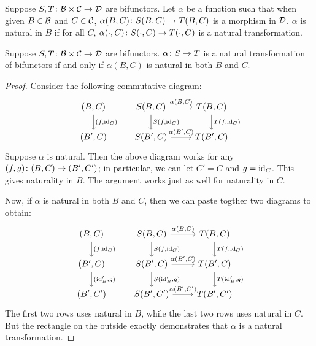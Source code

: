 \begin{definition}
    Suppose \(S,T\colon\mathcal{B}\times\mathcal{C}\to\mathcal{D}\) are bifunctors.
    Let \(\alpha\) be a function such that when given \(B \in \mathcal{B}\) and \(C \in \mathcal{C}\),
    \(\alpha(B,C)\colon S(B,C)\to T(B,C)\) is a morphism in \(\mathcal{D}\).
    \(\alpha\) is natural in \(B\) if for all \(C\),
    \(\alpha(\cdot,C)\colon S(\cdot,C)\to T(\cdot,C)\) is a natural transformation.
\end{definition}
\begin{proposition}\label{prop:natural-bifunctor}
    Suppose \(S,T\colon\mathcal{B}\times\mathcal{C}\to\mathcal{D}\) are bifunctors.
    \(\alpha\colon S\to T\) is a natural transformation of bifunctors
    if and only if \(\alpha(B,C)\) is natural in both \(B\) and \(C\).
\end{proposition}
\begin{proof}
    Consider the following commutative diagram:
    \begin{equation*}
        \begin{tikzcd}
            (B,C) \arrow{d}{(f,\id_C)} & S(B,C) \arrow{d}{S(f,\id_C)} \arrow{r}{\alpha(B,C)} & T(B,C) \arrow{d}{T(f,\id_C)}  \\
            (B',C) & S(B',C) \arrow{r}{\alpha(B',C)} & T(B',C)
        \end{tikzcd}
    \end{equation*}
    Suppose \(\alpha\) is natural.
    Then the above diagram works for any \((f,g)\colon(B,C)\to(B',C')\);
    in particular, we can let \(C' = C\) and \(g = \operatorname{id}_C\).
    This gives naturality in \(B\).
    The argument works just as well for naturality in \(C\).

    Now, if \(\alpha\) is natural in both \(B\) and \(C\),
    then we can paste togther two diagrams to obtain:
    \begin{equation*}
        \begin{tikzcd}
            (B,C) \arrow{d}{(f,\id_C)} & S(B,C) \arrow{d}{S(f,\id_C)} \arrow{r}{\alpha(B,C)} & T(B,C) \arrow{d}{T(f,\id_C)}  \\
            (B',C) \arrow{d}{(\id_B',g)} & S(B',C) \arrow{d}{S(\id_B',g)} \arrow{r}{\alpha(B',C)} & T(B',C) \arrow{d}{T(\id_B',g)} \\
            (B',C') & S(B',C') \arrow{r}{\alpha(B',C')} & T(B',C')
        \end{tikzcd}
    \end{equation*}
    The first two rows uses natural in \(B\), while the last two rows uses natural in \(C\).
    But the rectangle on the outside exactly demonstrates that \(\alpha\) is a natural transformation.
\end{proof}

